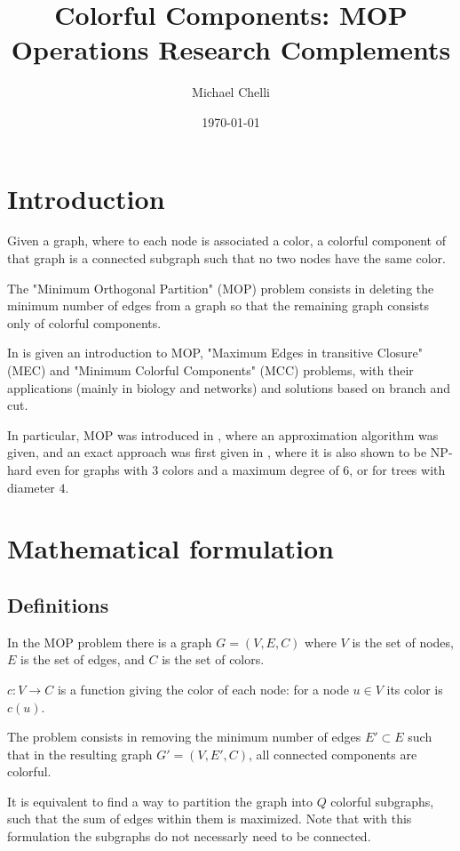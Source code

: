 \documentclass{article}
\title{Colorful Components: MOP \\
\large Operations Research Complements
}
\author{Michael Chelli}
\date{\today}
\begin{document}
\raggedright
\maketitle
\newpage
\tableofcontents
\newpage
\section{Introduction}
Given a graph, where to each node is associated a color,
a colorful component of that graph is a connected subgraph such that no two nodes have the same color.

The "Minimum Orthogonal Partition" (MOP) problem consists in deleting the minimum number of edges from a graph
so that the remaining graph consists only of colorful components.

In \parencite{ccc2025} is given an introduction to MOP, "Maximum Edges in transitive Closure" (MEC) and "Minimum Colorful Components" (MCC) problems,
with their applications (mainly in biology and networks) and solutions based on branch and cut.

In particular, MOP was introduced in \parencite{he2000}, where an approximation algorithm was given, and an exact approach was first given in \parencite{mop2012},
where it is also shown to be NP-hard even for graphs with $3$ colors and a maximum degree of $6$, or for trees with diameter $4$.

\section{Mathematical formulation}
\subsection{Definitions}
In the MOP problem there is a graph
$G = (V,E,C)$ where $V$ is the set of nodes, $E$ is the set of edges, and $C$ is the set of colors.

$c : V \to C$ is a function giving the color of each node: for a node $u \in V$ its color is $c(u)$.

The problem consists in removing the minimum number of edges $E' \subset E$ such that in the resulting graph $G' = (V, E', C)$,
all connected components are colorful.

It is equivalent to find a way to partition the graph into $Q$ colorful subgraphs,
such that the sum of edges within them is maximized.
Note that with this formulation the subgraphs do not necessarly need to be connected.
\end{document}
